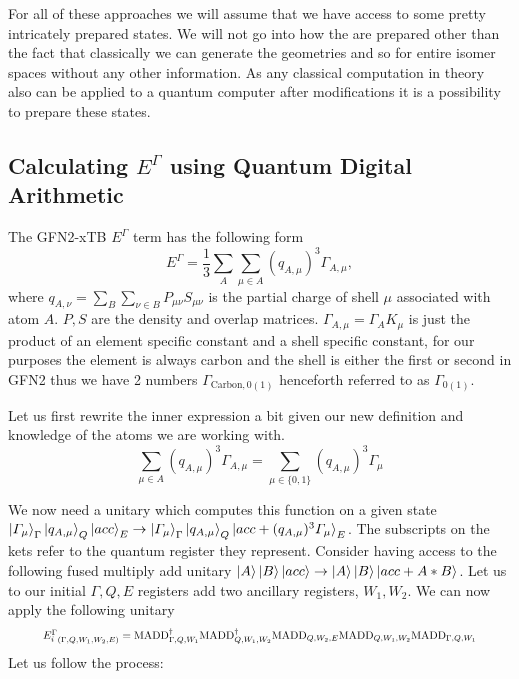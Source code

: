 For all of these approaches we will assume that we have access to some pretty intricately prepared states. 
We will not go into how the are prepared other than the fact that classically we can generate the geometries and so for entire isomer spaces without any other information. 
As any classical computation in theory also can be applied to a quantum computer after modifications it is a possibility to prepare these states. 


\subsection{Calculating $E^\Gamma$ using Quantum Digital Arithmetic}
The GFN2-xTB $E^\Gamma$ term has the following form\cite{bannwarth2021}
\begin{equation}
    E^\Gamma = \frac{1}{3}\sum_A\sum_{\mu\in A} (q_{A,\mu})^3\Gamma_{A,\mu},
\end{equation}
where $q_{A,\nu}=\sum_B\sum_{\nu\in B}P_{\mu\nu}S_{\mu\nu}$ is the partial charge of shell $\mu$ associated with atom $A$. $P, S$ are the density and overlap matrices. $\Gamma_{A,\mu} = \Gamma_A K_\mu$ is just the product of an element specific constant and a shell specific constant, for our purposes the element is always carbon and the shell is either the first or second in GFN2 thus we have 2 numbers $\Gamma_{\text{Carbon},0(1)}$ henceforth referred to as $\varGamma_{0(1)}$. 

\vspace{\baselineskip}
\noindent
Let us first rewrite the inner expression a bit given our new definition and knowledge of the atoms we are working with. 
\begin{equation}
    \sum_{\mu\in A} (q_{A,\mu})^3\Gamma_{A,\mu} = \sum_{\mu \in \{0,1\}} (q_{A,\mu})^3\varGamma_{\mu}
\end{equation}

We now need a unitary which computes this function on a given state $\ket{\varGamma_\mu}_\Gamma\ket{q_{A,\mu}}_Q\ket{acc}_E \to \ket{\varGamma_\mu}_\Gamma\ket{q_{A,\mu}}_Q\ket{acc+(q_{A,\mu})^3\varGamma_{\mu}}_E$. The subscripts on the kets refer to the quantum register they represent. 
Consider having access to the following fused multiply add unitary $\ket{A}\ket{B}\ket{acc} \to \ket{A}\ket{B}\ket{acc+A*B}$. 
Let us to our initial $\Gamma, Q, E$ registers add two ancillary registers, $W_1,W_2$. 
We can now apply the following unitary 
\begin{equation}
    \resizebox{.9\hsize}{!}{${E_i^\Gamma}_{(\Gamma,Q,W_1,W_2,E)} = \text{MADD}^\dagger_{\Gamma,Q,W_1}\text{MADD}^\dagger_{Q,W_1,W_2}\text{MADD}_{Q,W_2,E}\text{MADD}_{Q,W_1,W_2}\text{MADD}_{\Gamma,Q,W_1}$}
\end{equation}
Let us follow the process:

